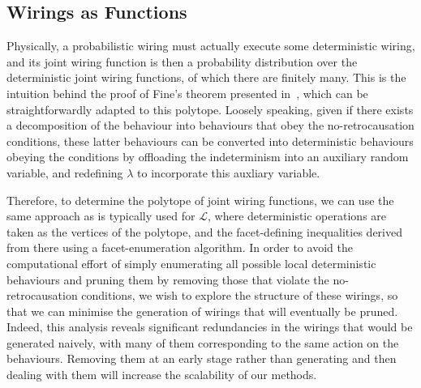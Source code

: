 \documentclass[10pt, a4paper]{article}
\numberwithin{equation}{section} %
\theoremstyle{definition}
\theoremstyle{plain}
\newcommand{\?}{\mathrel{?}} %
\newcommand{\Ls}{\mathcal{L}}
\begin{document}
      \subsection{Wirings as Functions}

      Physically, a probabilistic wiring must actually execute some deterministic wiring, and its joint wiring function is then a probability distribution over the deterministic joint wiring functions, of which there are finitely many. This is the intuition behind the proof of Fine's theorem presented in~\cite{BellNonlocality}, which can be straightforwardly adapted to this polytope. Loosely speaking, given if there exists a decomposition of the behaviour into behaviours that obey the no-retrocausation conditions, these latter behaviours can be converted into deterministic behaviours obeying the conditions by offloading the indeterminism into an auxiliary random variable, and redefining \(\lambda\) to incorporate this auxliary variable.

      Therefore, to determine the polytope of joint wiring functions, we can use the same approach as is typically used for \(\Ls\), where deterministic operations are taken as the vertices of the polytope, and the facet-defining inequalities derived from there using a facet-enumeration algorithm. In order to avoid the computational effort of simply enumerating all possible local deterministic behaviours and pruning them by removing those that violate the no-retrocausation conditions, we wish to explore the structure of these wirings, so that we can minimise the generation of wirings that will eventually be pruned. Indeed, this analysis reveals significant redundancies in the wirings that would be generated naively, with many of them corresponding to the same action on the behaviours. Removing them at an early stage rather than generating and then dealing with them will increase the scalability of our methods.
\end{document}
